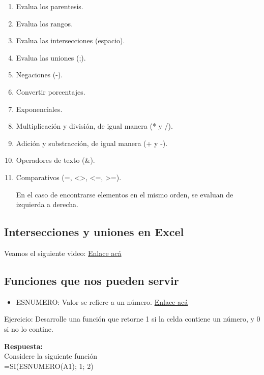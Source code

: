 \documentclass[12 pt,letterpaper]{article}
\newenvironment{solution}
{\begin{mdframed} \textbf{Respuesta:} \ \\}
	{\end{mdframed}}
\begin{document}
\begin{enumerate}
	\item Evalua los parentesis.
	\item Evalua los rangos.
	\item Evalua las intersecciones (espacio).
	\item Evalua las uniones (;).
	\item Negaciones (-).
	\item Convertir porcentajes.
	\item Exponenciales.
	\item Multiplicación y división, de igual manera (* y /).
	\item Adición y substracción, de igual manera (+ y -).
	\item Operadores de texto (\&).
	\item Comparativos (=, <>, <=, >=).
	
	En el caso de encontrarse elementos en el mismo orden, se evaluan de izquierda a derecha. 
\end{enumerate}

\subsection{Intersecciones y uniones en Excel}

Veamos el siguiente video: \href{https://web.microsoftstream.com/video/a00c02ae-3403-40f1-92ee-a5f5e49843f2}{Enlace acá}


\subsection{Funciones que nos pueden servir}

\begin{itemize}
	\item ESNUMERO: Valor se refiere a un número. \href{https://support.microsoft.com/es-es/office/funciones-es-0f2d7971-6019-40a0-a171-f2d869135665}{Enlace acá}

\end{itemize}

\noindent
{\Huge \faBell} Ejercicio: Desarrolle una función que retorne 1 si la celda contiene un número, y 0 si no lo contine. 

\begin{solution}
	
Considere la siguiente función \\

=SI(ESNUMERO(A1); 1; 2)
	
\end{solution}
\end{document}
